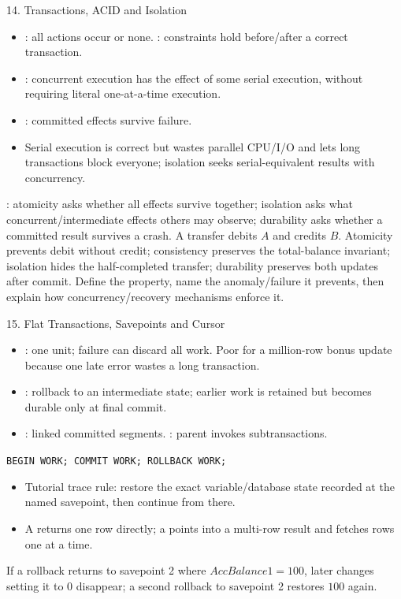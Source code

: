 \begin{topic}{14. Transactions, ACID and Isolation}
\begin{itemize}
  \item {}: all actions occur or none. : constraints hold before/after a correct transaction.
  \item {}: concurrent execution has the effect of some serial execution, without requiring literal one-at-a-time execution.
  \item {}: committed effects survive failure.
  \item Serial execution is correct but wastes parallel CPU/I/O and lets long transactions block everyone; isolation seeks serial-equivalent results with concurrency.
\end{itemize}
: atomicity asks whether all effects survive together; isolation asks what concurrent/intermediate effects others may observe; durability asks whether a committed result survives a crash.
\worked A transfer debits \(A\) and credits \(B\). Atomicity prevents debit without credit; consistency preserves the total-balance invariant; isolation hides the half-completed transfer; durability preserves both updates after commit.
\answer Define the property, name the anomaly/failure it prevents, then explain how concurrency/recovery mechanisms enforce it.
\end{topic}

\begin{topic}{15. Flat Transactions, Savepoints and Cursor}
\begin{itemize}
  \item {}: one unit; failure can discard all work. Poor for a million-row bonus update because one late error wastes a long transaction.
  \item {}: rollback to an intermediate state; earlier work is retained but becomes durable only at final commit.
  \item {}: linked committed segments. : parent invokes subtransactions.
\end{itemize}
\texttt{BEGIN WORK; \quad COMMIT WORK; \quad ROLLBACK WORK;}
\begin{itemize}
  \item Tutorial trace rule: restore the exact variable/database state recorded at the named savepoint, then continue from there.
  \item A  returns one row directly; a  points into a multi-row result and fetches rows one at a time.
\end{itemize}
\worked If a rollback returns to savepoint 2 where \(AccBalance1=100\), later changes setting it to \(0\) disappear; a second rollback to savepoint 2 restores \(100\) again.
\end{topic}

